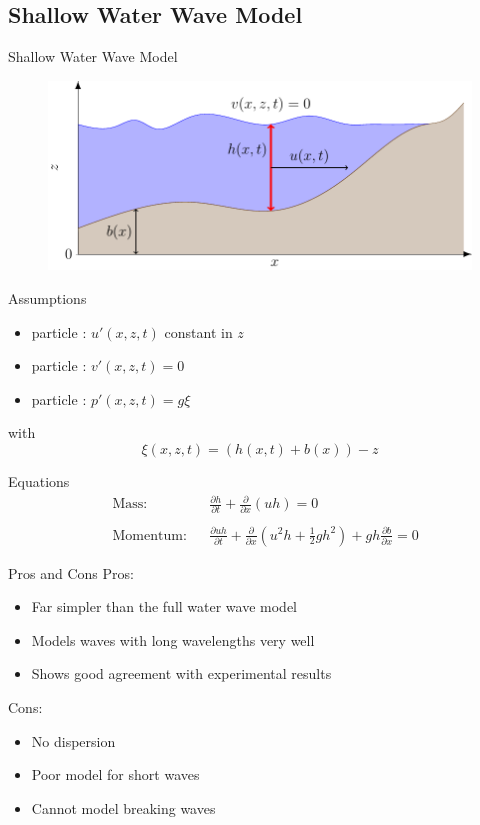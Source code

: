 \documentclass[handout]{beamer}
\begin{document}
\subsection{Shallow Water Wave Model}
\begin{frame}{Shallow Water Wave Model}
	\begin{figure}
		\includegraphics[width=\textwidth]{./Pics/WaterModelDiagrams/SWWE.pdf}
	\end{figure}
\end{frame}
\begin{frame}{Assumptions}
	\pause
	\begin{itemize}
		\item particle : $u'(x,z,t)$ constant in $z$
		\pause
		\item particle : $v'(x,z,t) = 0$
		\pause
		\item particle : $p'(x,z,t) = g \xi $
	\end{itemize}
	with 
	\[\xi(x,z,t) = \left(h(x,t) + b(x)\right) - z\]
\end{frame}
\begin{frame}{Equations}
	\begin{align*}
	&\text{Mass:} &&\frac{\partial h}{\partial t} + \frac{\partial }{\partial x}\left( uh\right) = 0 \\ \nonumber \\ 
	&\text{Momentum:} &&\frac{\partial u h}{\partial t} + \frac{\partial }{\partial x}\left( u^2h + \frac{1}{2}gh^2\right) + gh\frac{\partial b}{\partial x} = 0
	\end{align*}
\end{frame}
\begin{frame}{Pros and Cons}
	Pros:
	\begin{itemize}
		\item Far simpler than the full water wave model
		\item Models waves with long wavelengths very well 
		\item Shows good agreement with experimental results
	\end{itemize}
	\pause
	Cons:
	\begin{itemize}
		\item No dispersion
		\item Poor model for short waves 
		\item Cannot model breaking waves
	\end{itemize}
\end{frame}
\end{document}
